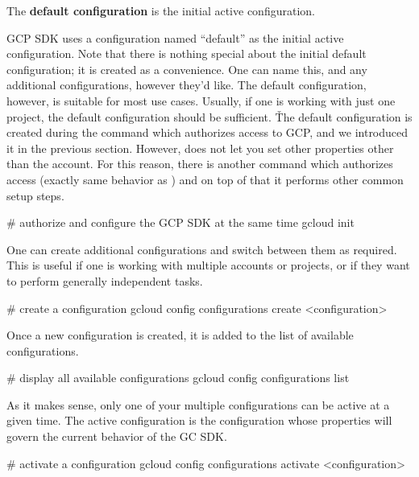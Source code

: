 The \textbf{default configuration} is the initial active configuration.
\ed

GCP SDK uses a configuration named ``default'' as the initial active configuration. Note that there is nothing special
about the initial default configuration; it is created as a convenience. One can name this, and any additional
configurations, however they'd like. The default configuration, however, is suitable for most use cases. Usually, if
one is working with just one project, the default configuration should be sufficient. \v

The default configuration is created during the  command which authorizes access to GCP\@,
and we introduced it in the previous section. However,  does not let you set other
properties other than the account. For this reason, there is another command  which authorizes
access (exactly same behavior as ) and on top of that it performs other common setup steps.

\begin{bash}
# authorize and configure the GCP SDK at the same time
gcloud init
\end{bash}

One can create additional configurations and switch between them as required. This is useful if one is working with
multiple accounts or projects, or if they want to perform generally independent tasks.

\begin{bash}
# create a configuration
gcloud config configurations create <configuration>
\end{bash}

Once a new configuration is created, it is added to the list of available configurations.

\begin{bash}
# display all available configurations
gcloud config configurations list
\end{bash}

As it makes sense, only one of your multiple configurations can be active at a given time. The active configuration
is the configuration whose properties will govern the current behavior of the GC SDK\@.

\begin{bash}
# activate a configuration
gcloud config configurations activate <configuration>
\end{bash}

